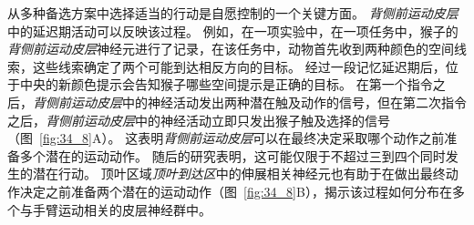 从多种备选方案中选择适当的行动是自愿控制的一个关键方面。
\textit{背侧前运动皮层}中的延迟期活动可以反映该过程。
例如，在一项实验中，在一项任务中，猴子的\textit{背侧前运动皮层}神经元进行了记录，在该任务中，动物首先收到两种颜色的空间线索，这些线索确定了两个可能到达相反方向的目标。 
经过一段记忆延迟期后，位于中央的新颜色提示会告知猴子哪些空间提示是正确的目标。
在第一个指令之后，\textit{背侧前运动皮层}中的神经活动发出两种潜在触及动作的信号，但在第二次指令之后，\textit{背侧前运动皮层}中的神经活动立即只发出猴子触及选择的信号（图~\ref{fig:34_8}A）。
这表明\textit{背侧前运动皮层}可以在最终决定采取哪个动作之前准备多个潜在的运动动作。
随后的研究表明，这可能仅限于不超过三到四个同时发生的潜在行动。
顶叶区域\textit{顶叶到达区}中的伸展相关神经元也有助于在做出最终动作决定之前准备两个潜在的运动动作（图~\ref{fig:34_8}B），揭示该过程如何分布在多个与手臂运动相关的皮层神经群中。


